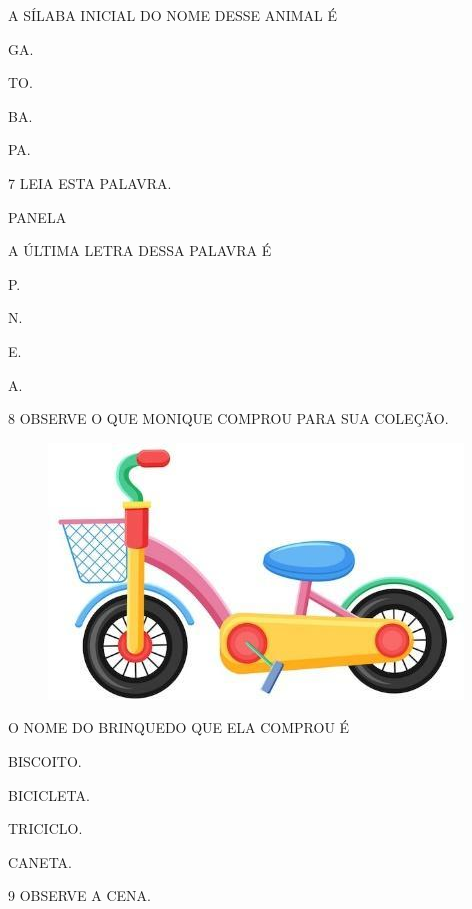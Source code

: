 A SÍLABA INICIAL DO NOME DESSE ANIMAL É

\begin{escolha}
\item GA.

\item TO.

\item BA.

\item PA.
\end{escolha}

\num{7} LEIA ESTA PALAVRA.

\begin{myquote}
\centering\large{PANELA}
\end{myquote}

A ÚLTIMA LETRA DESSA PALAVRA É

\begin{escolha}
\item P.

\item N.

\item E.

\item A.
\end{escolha}


\num{8} OBSERVE O QUE MONIQUE COMPROU PARA SUA COLEÇÃO.

\begin{figure}[H]
\centering
\includegraphics[width=.3\textwidth]{media/image217.jpg}
\end{figure}

O NOME DO BRINQUEDO QUE ELA COMPROU É

\begin{escolha}
\item BISCOITO.

\item BICICLETA.

\item TRICICLO.

\item CANETA.
\end{escolha}

\num{9} OBSERVE A CENA.

